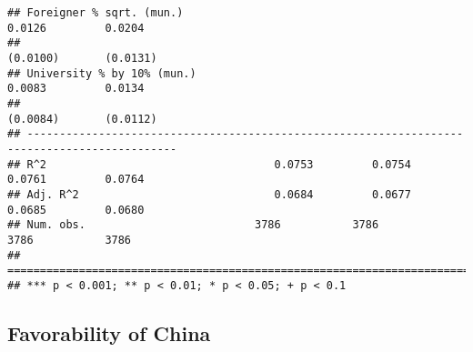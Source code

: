 \documentclass[
]{article}
\begin{document}
\begin{verbatim}
## Foreigner % sqrt. (mun.)                                            0.0126         0.0204    
##                                                                    (0.0100)       (0.0131)   
## University % by 10% (mun.)                                          0.0083         0.0134    
##                                                                    (0.0084)       (0.0112)   
## ---------------------------------------------------------------------------------------------
## R^2                                   0.0753         0.0754         0.0761         0.0764    
## Adj. R^2                              0.0684         0.0677         0.0685         0.0680    
## Num. obs.                          3786           3786           3786           3786         
## =============================================================================================
## *** p < 0.001; ** p < 0.01; * p < 0.05; + p < 0.1
\end{verbatim}

\hypertarget{favorability-of-china-4}{%
\subsection{Favorability of China}\label{favorability-of-china-4}}
\end{document}
